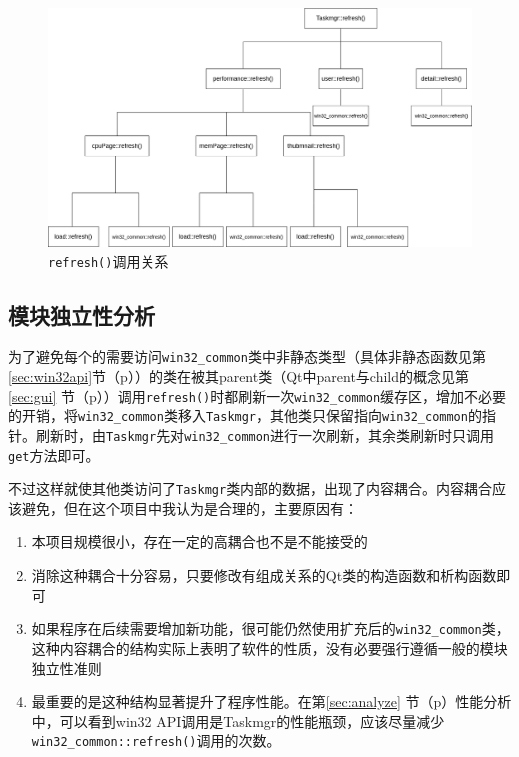 \documentclass[UTF8,twoside,titlepage]{ctexart}
\newcommand\code[1]{\texttt{#1}}
\begin{document}
\begin{figure}
    \centering
    \includegraphics[angle=90,scale=0.5]{../dia/refresh call.png}
    \caption{\code{refresh()}调用关系}
    \label{fig:call}
\end{figure}

\subsection{模块独立性分析}
为了避免每个的需要访问\code{win32\_common}类中非静态类型（具体非静态函数见第\ref{sec:win32api}节（p\pageref{sec:win32api}））的类在被其parent类（Qt中parent与child的概念见第\ref{sec:gui} 节（p\pageref{sec:gui}））调用\code{refresh()}时都刷新一次\code{win32\_common}缓存区，增加不必要的开销，将\code{win32\_common}类移入\code{Taskmgr}，其他类只保留指向\code{win32\_common}的指针。刷新时，由\code{Taskmgr}先对\code{win32\_common}进行一次刷新，其余类刷新时只调用\code{get}方法即可。

不过这样就使其他类访问了\code{Taskmgr}类内部的数据，出现了内容耦合。内容耦合应该避免，但在这个项目中我认为是合理的，主要原因有：
\begin{enumerate}
    \item 本项目规模很小，存在一定的高耦合也不是不能接受的
    \item 消除这种耦合十分容易，只要修改有组成关系的Qt类的构造函数和析构函数即可
    \item 如果程序在后续需要增加新功能，很可能仍然使用扩充后的\code{win32\_common}类，这种内容耦合的结构实际上表明了软件的性质，没有必要强行遵循一般的模块独立性准则
    \item 最重要的是这种结构显著提升了程序性能。在第\ref{sec:analyze} 节（p\pageref{sec:analyze}）性能分析中，可以看到win32 API调用是Taskmgr的性能瓶颈，应该尽量减少\code{win32\_common::refresh()}调用的次数。
\end{enumerate}
\end{document}
